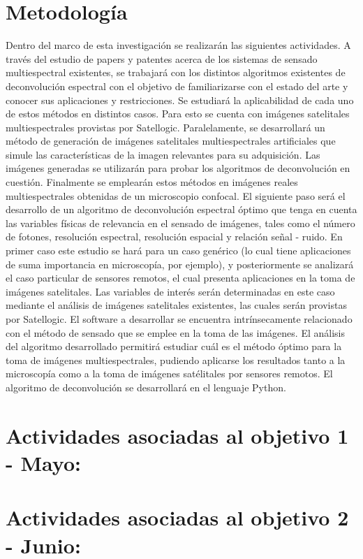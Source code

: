 \documentclass{ctuthesis}
\begin{document}
\section*{Metodología}
Dentro del marco de esta investigación se realizarán las siguientes actividades. A través del estudio de papers y patentes acerca de los sistemas de sensado multiespectral existentes, se trabajará con los distintos algoritmos existentes de deconvolución espectral con el objetivo de familiarizarse con el estado del arte y conocer sus aplicaciones y restricciones. Se estudiará la aplicabilidad de cada uno de estos métodos en distintos casos. Para esto se cuenta con imágenes satelitales multiespectrales provistas por Satellogic. 
Paralelamente, se desarrollará un método de generación de imágenes satelitales multiespectrales artificiales que simule las características de la imagen relevantes para su adquisición. Las imágenes generadas se utilizarán para probar los algoritmos de deconvolución en cuestión. Finalmente se emplearán estos métodos en imágenes reales multiespectrales obtenidas de un microscopio confocal. 
El siguiente paso será el desarrollo de un algoritmo de deconvolución espectral óptimo que tenga en cuenta las variables físicas de relevancia en el sensado de imágenes, tales como el número de fotones, resolución espectral, resolución espacial y relación señal - ruido. En primer caso este estudio se hará para un caso genérico (lo cual tiene aplicaciones de suma importancia en microscopía, por ejemplo), y posteriormente se analizará el caso particular de sensores remotos, el cual presenta aplicaciones en la toma de imágenes satelitales. Las variables de interés serán determinadas en este caso mediante el análisis de imágenes satelitales existentes, las cuales serán provistas por Satellogic.
El software a desarrollar se encuentra intrínsecamente relacionado con el método de sensado que se emplee en la toma de las imágenes. El análisis del algoritmo desarrollado permitirá estudiar cuál es el método óptimo para la toma de imágenes multiespectrales, pudiendo aplicarse los resultados tanto a la microscopía como a la toma de imágenes satélitales por sensores remotos. El algoritmo de deconvolución se desarrollará en el lenguaje Python. 

\section*{Actividades asociadas al objetivo 1 - Mayo:}
\section*{Actividades asociadas al objetivo 2 - Junio:}
\end{document}

